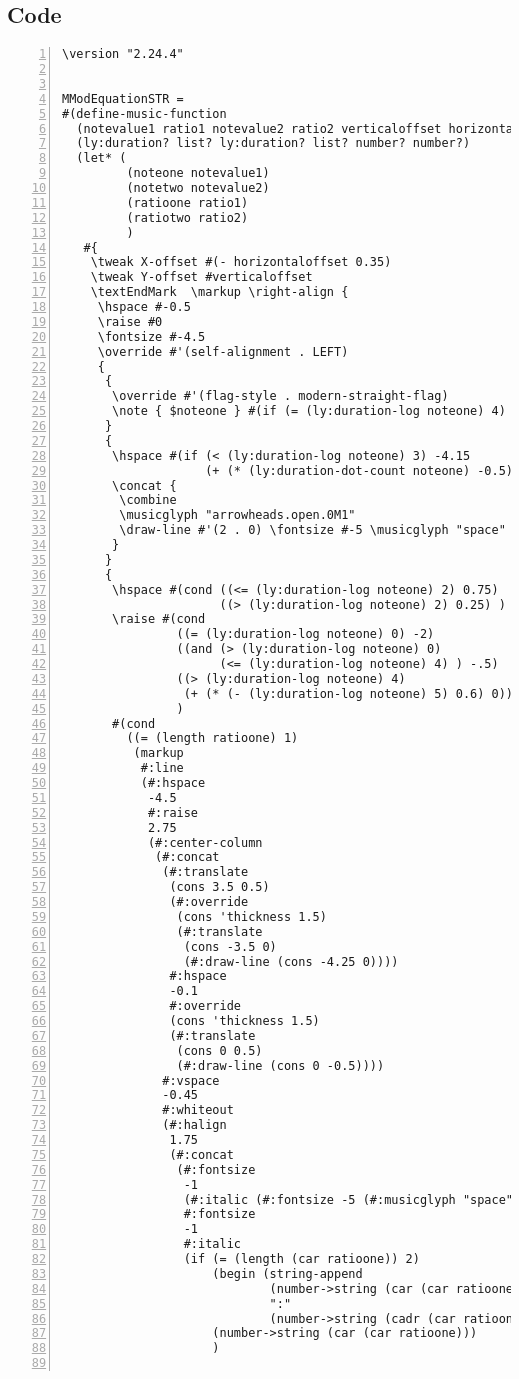 \subsection{Code}
\begin{Verbatim}[numbers=left,xleftmargin=5mm]
\version "2.24.4"


MModEquationSTR =
#(define-music-function
  (notevalue1 ratio1 notevalue2 ratio2 verticaloffset horizontaloffset)
  (ly:duration? list? ly:duration? list? number? number?)
  (let* (
         (noteone notevalue1)
         (notetwo notevalue2)
         (ratioone ratio1)
         (ratiotwo ratio2)
         )
   #{
    \tweak X-offset #(- horizontaloffset 0.35)
    \tweak Y-offset #verticaloffset
    \textEndMark  \markup \right-align {
     \hspace #-0.5
     \raise #0
     \fontsize #-4.5
     \override #'(self-alignment . LEFT)
     {
      {
       \override #'(flag-style . modern-straight-flag)
       \note { $noteone } #(if (= (ly:duration-log noteone) 4) 1 1 )
      }
      {
       \hspace #(if (< (ly:duration-log noteone) 3) -4.15
                    (+ (* (ly:duration-dot-count noteone) -0.5) -4.5))
       \concat {
        \combine
        \musicglyph "arrowheads.open.0M1"
        \draw-line #'(2 . 0) \fontsize #-5 \musicglyph "space"
       }
      }
      {
       \hspace #(cond ((<= (ly:duration-log noteone) 2) 0.75)
                      ((> (ly:duration-log noteone) 2) 0.25) )
       \raise #(cond
                ((= (ly:duration-log noteone) 0) -2)
                ((and (> (ly:duration-log noteone) 0)
                      (<= (ly:duration-log noteone) 4) ) -.5)
                ((> (ly:duration-log noteone) 4)
                 (+ (* (- (ly:duration-log noteone) 5) 0.6) 0))
                )
       #(cond
         ((= (length ratioone) 1)
          (markup
           #:line
           (#:hspace
            -4.5
            #:raise
            2.75
            (#:center-column
             (#:concat
              (#:translate
               (cons 3.5 0.5)
               (#:override
                (cons 'thickness 1.5)
                (#:translate
                 (cons -3.5 0)
                 (#:draw-line (cons -4.25 0))))
               #:hspace
               -0.1
               #:override
               (cons 'thickness 1.5)
               (#:translate
                (cons 0 0.5)
                (#:draw-line (cons 0 -0.5))))
              #:vspace
              -0.45
              #:whiteout
              (#:halign
               1.75
               (#:concat
                (#:fontsize
                 -1
                 (#:italic (#:fontsize -5 (#:musicglyph "space")))
                 #:fontsize
                 -1
                 #:italic
                 (if (= (length (car ratioone)) 2)
                     (begin (string-append
                             (number->string (car (car ratioone)))
                             ":"
                             (number->string (cadr (car ratioone))))  )
                     (number->string (car (car ratioone)))
                     )


\end{Verbatim}
